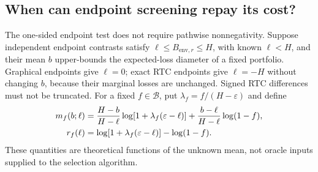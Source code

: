 \documentclass[preprint,11pt,sort&compress]{elsarticle}
\begin{document}
\subsection{When can endpoint screening repay its cost?}
\label{sec:screen_cost}
The one-sided endpoint test does not require pathwise nonnegativity. Suppose
independent endpoint contrasts satisfy $\ell\le B_{\mathrm{env},r}\le H$, with known
$\ell<H$, and their mean $b$ upper-bounds the expected-loss diameter of a
fixed portfolio. Graphical endpoints give $\ell=0$; exact RTC endpoints give
$\ell=-H$ without changing $b$, because their marginal losses are unchanged.
Signed RTC differences must not be truncated. For a fixed $f\in\mathcal B$,
put $\lambda_f=f/(H-\varepsilon)$ and define
\begin{align}
 m_f(b;\ell)&=\frac{H-b}{H-\ell}\log[1+\lambda_f(\varepsilon-\ell)]
       +\frac{b-\ell}{H-\ell}\log(1-f),\notag\\
 r_f(\ell)&=\log[1+\lambda_f(\varepsilon-\ell)]-\log(1-f).
 \label{eq:chord_drift}
\end{align}
These quantities are theoretical functions of the unknown mean, not oracle
inputs supplied to the selection algorithm.
\end{document}
